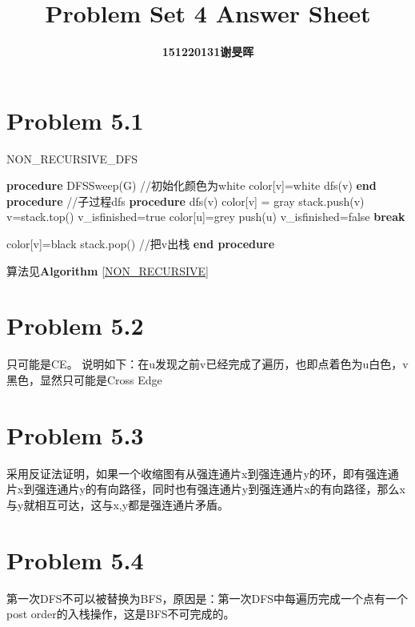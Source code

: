\documentclass[twocolumn]{ctexart}
\begin{document}
	\title{Problem Set 4 Answer Sheet}
	\author{\textbf{151220131谢旻晖}}
	\date{}
	\maketitle
	
\section*{Problem 5.1}
\begin{algorithm}
	\caption{NON\_RECURSIVE\_DFS}
	\label{NON_RECURSIVE}
	\begin{algorithmic}[1]
		\STATE \textbf{procedure} DFSSweep(G)
		\STATE //初始化颜色为white
			\STATE color[v]=white
		\ENDFOR
			\STATE dfs(v)
		\ENDIF
		\ENDFOR
		\STATE \textbf{end procedure}
		\STATE  
		\STATE  //子过程dfs
		\STATE \textbf{procedure} dfs(v)
			\STATE color[v] = gray
			\STATE stack.push(v)
				\STATE	v=stack.top()
				\STATE v\_isfinished=true
						\STATE color[u]=grey
						\STATE push(u)
						\STATE v\_isfinished=false
						\STATE \textbf{break}
					\ENDIF
					
					\IF{v\_isfinished}
						\STATE color[v]=black
						\STATE stack.pop() //把v出栈
					\ENDIF
				\ENDFOR
			\ENDWHILE
		\STATE \textbf{end procedure}		
	\end{algorithmic}
\end{algorithm}
\indent 算法见\textbf{Algorithm }\ref{NON_RECURSIVE}

\section*{Problem 5.2}
\indent 只可能是CE。
\indent 说明如下：在u发现之前v已经完成了遍历，也即点着色为u白色，v黑色，显然只可能是Cross Edge

\section*{Problem 5.3}
\indent 采用反证法证明，如果一个收缩图有从强连通片x到强连通片y的环，即有强连通片x到强连通片y的有向路径，同时也有强连通片y到强连通片x的有向路径，那么x与y就相互可达，这与x,y都是强连通片矛盾。


\section*{Problem 5.4}
\indent 第一次DFS不可以被替换为BFS，原因是：第一次DFS中每遍历完成一个点有一个post order的入栈操作，这是BFS不可完成的。\\
\end{document}
